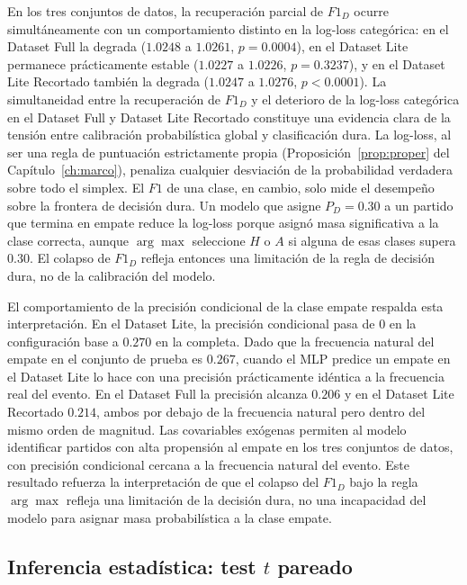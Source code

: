 En los tres conjuntos de datos, la recuperaci\'on parcial de $F1_D$ ocurre simult\'aneamente con un comportamiento distinto en la log-loss categ\'orica: en el Dataset Full la degrada ($1{.}0248$ a $1{.}0261$, $p=0.0004$), en el Dataset Lite permanece pr\'acticamente estable ($1{.}0227$ a $1{.}0226$, $p=0.3237$), y en el Dataset Lite Recortado tambi\'en la degrada ($1{.}0247$ a $1{.}0276$, $p<0.0001$). La simultaneidad entre la recuperaci\'on de $F1_D$ y el deterioro de la log-loss categ\'orica en el Dataset Full y Dataset Lite Recortado constituye una evidencia clara de la tensi\'on entre calibraci\'on probabil\'istica global y clasificaci\'on dura. La log-loss, al ser una regla de puntuaci\'on estrictamente propia (Proposici\'on~\ref{prop:proper} del Cap\'itulo~\ref{ch:marco}), penaliza cualquier desviaci\'on de la probabilidad verdadera sobre todo el simplex. El $F1$ de una clase, en cambio, solo mide el desempe\~no sobre la frontera de decisi\'on dura. Un modelo que asigne $P_D = 0{.}30$ a un partido que termina en empate reduce la log-loss porque asign\'o masa significativa a la clase correcta, aunque $\arg\max$ seleccione $H$ o $A$ si alguna de esas clases supera $0{.}30$. El colapso de $F1_D$ refleja entonces una limitaci\'on de la regla de decisi\'on dura, no de la calibraci\'on del modelo.

El comportamiento de la precisi\'on condicional de la clase empate respalda esta interpretaci\'on. En el Dataset Lite, la precisi\'on condicional pasa de $0$ en la configuraci\'on base a $0{.}270$ en la completa. Dado que la frecuencia natural del empate en el conjunto de prueba es $0{.}267$, cuando el MLP predice un empate en el Dataset Lite lo hace con una precisi\'on pr\'acticamente id\'entica a la frecuencia real del evento. En el Dataset Full la precisi\'on alcanza $0{.}206$ y en el Dataset Lite Recortado $0{.}214$, ambos por debajo de la frecuencia natural pero dentro del mismo orden de magnitud. Las covariables ex\'ogenas permiten al modelo identificar partidos con alta propensi\'on al empate en los tres conjuntos de datos, con precisi\'on condicional cercana a la frecuencia natural del evento. Este resultado refuerza la interpretaci\'on de que el colapso del $F1_D$ bajo la regla $\arg\max$ refleja una limitaci\'on de la decisi\'on dura, no una incapacidad del modelo para asignar masa probabil\'istica a la clase empate.

\subsection{Inferencia estad\'istica: test $t$ pareado}
\label{subsec:res_test_t}

